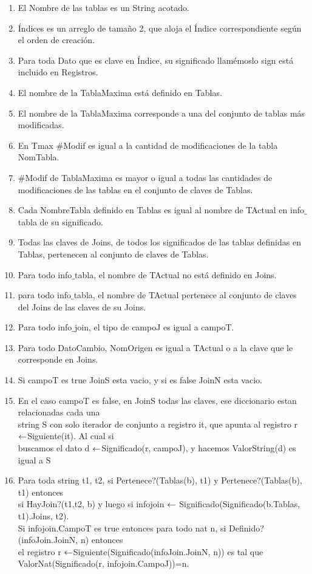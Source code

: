 \begin{enumerate}
  \item El Nombre de las tablas es un String acotado.
  \item Índices es un arreglo de tamaño 2, que aloja el Índice correspondiente según el orden de creación.
  \item Para toda Dato que es clave en Índice, su significado llamémoslo sign está incluido en Registros.
  \item El nombre de la TablaMaxima está definido en Tablas.
  \item El nombre de la TablaMaxima corresponde a una del conjunto de tablas más modificadas.
  \item En Tmax $\#$Modif es igual a la cantidad de modificaciones de la tabla NomTabla.
  \item $\#$Modif de TablaMaxima es mayor o igual a todas las cantidades de modificaciones de las tablas en el conjunto de claves de Tablas.
  \item Cada NombreTabla definido en Tablas es igual al nombre de TActual en info$\_$tabla de su significado.
  \item Todas las claves de Joins, de todos los significados de las tablas definidas en Tablas, pertenecen al conjunto de claves de Tablas.
  \item Para todo info$\_$tabla, el nombre de TActual no está definido en Joins.
  \item para todo info$\_$tabla, el nombre de TActual pertenece al conjunto de claves del Joins de las claves de su Joins.
  \item Para todo info$\_$join, el tipo de campoJ es igual a campoT.
  \item Para todo DatoCambio, NomOrigen es igual a TActual o a la clave que le corresponde en Joins.
  \item Si campoT es true JoinS esta vacio, y si es false JoinN esta vacio.	
  \item En el caso campoT es false, en JoinS todas las claves, ese diccionario estan relacionadas cada una\\
  string S con solo iterador de conjunto a registro it, que apunta al registro r $\leftarrow$Siguiente(it). Al cual si\\
  buscamos el dato d $\leftarrow$Significado(r, campoJ), y hacemos ValorString(d) es igual a S
  
  
  \item Para toda string t1, t2, si Pertenece?(Tablas(b), t1) y Pertenece?(Tablas(b), t1) entonces\\
  si HayJoin?(t1,t2, b) y luego si infojoin $\leftarrow$ Significado(Significado(b.Tablas, t1).Joins, t2).\\
  Si infojoin.CampoT es true entonces para todo nat n, si Definido?(infoJoin.JoinN, n) entonces\\
  el registro r $\leftarrow$Siguiente(Significado(infoJoin.JoinN, n)) es tal que \\
  ValorNat(Significado(r, infojoin.CampoJ))=n.


\end{enumerate}
